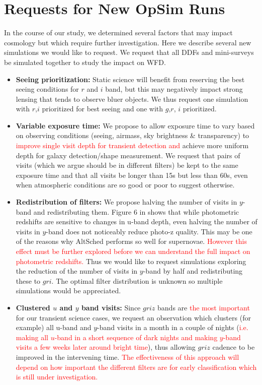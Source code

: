 \documentclass[12pt, letterpaper]{article}
\newcommand{\review}[1]{{\textcolor{red}{#1}}}
\begin{document}
\section{Requests for New OpSim Runs}
\label{sec:requests}
In the course of our study, we determined several factors that may impact cosmology but which require further investigation. Here we describe several new simulations we would like to request. We request that all DDFs and mini-surveys be simulated together to study the impact on WFD. 
\begin{itemize}
    \item {\bfseries Seeing prioritization:} Static science will benefit from reserving the best seeing conditions for $r$ and $i$ band, but this may negatively impact strong lensing that tends to observe bluer objects. We thus request one simulation with $r$,$i$ prioritized for best seeing and one with $g$,$r$, $i$ prioritized. 
    
    \item {\bfseries Variable exposure time:} We propose to allow exposure time to vary based on observing conditions (seeing, airmass, sky brightness \& transparency) to \review{improve single visit depth for transient detection and} achieve more uniform depth for galaxy detection/shape measurement. 
    We request that pairs of visits (which we argue should be in different filters) be kept to the same exposure time and that all visits be longer than 15s but less than 60s, even when atmospheric conditions are so good or poor to suggest otherwise. 
    
    \item {\bfseries Redistribution of filters:} We propose halving the number of visits in $y$-band and redistributing them. Figure 6 in \cite{graham2017} shows that while photometric redshifts are sensitive to changes in u-band depth, even halving the number of visits in $y$-band does not noticeably reduce photo-z quality. This may be one of the reasons why AltSched performs so well for supernovae. \review{However this effect must be further explored before we can understand the full impact on photometric redshifts.} Thus we would like to request simulations exploring the reduction of the number of visits in $y$-band by half and redistributing these to $gri$. The optimal filter distribution is unknown so multiple simulations would be appreciated.
    
    \item {\bfseries Clustered $u$ and  $y$  band visits:} Since $griz$ bands are \review{the most important} for our transient science cases, we request an observation which clusters (for example) all u-band and $y$-band visits in a month in a couple of nights (\review{i.e. making all $u$-band in a short sequence of dark nights and making $y$-band visits a few weeks later around bright time}), thus allowing $griz$ cadence to be improved in the intervening time. \review{The effectiveness of this approach will depend on how important the different filters are for early classification which is still under investigation.}
    

\end{itemize}
\end{document}
